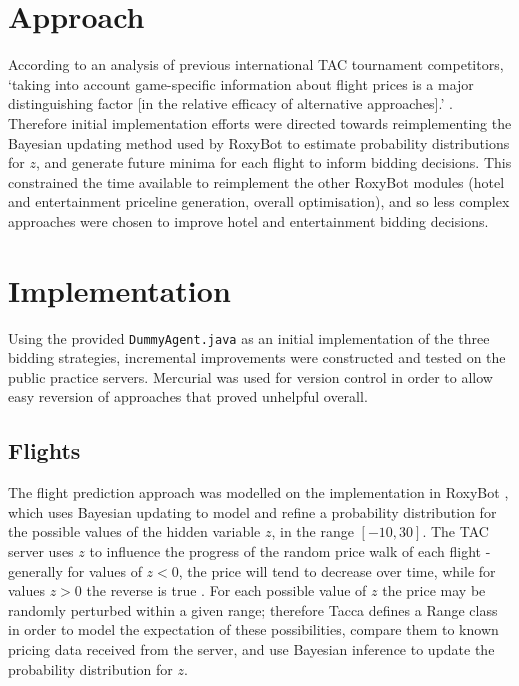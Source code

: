 \documentclass[oribibl]{llncs}
\begin{document}
\section{Approach}
According to an analysis of previous international TAC tournament competitors, `taking into account game-specific information about flight prices is a major distinguishing factor [in the relative efficacy of alternative approaches].' \cite{wellman2003price}. Therefore initial implementation efforts were directed towards reimplementing the Bayesian updating method used by RoxyBot to estimate probability distributions for $z$, and generate future minima for each flight to inform bidding decisions. This constrained the time available to reimplement the other RoxyBot modules (hotel and entertainment priceline generation, overall optimisation), and so less complex approaches were chosen to improve hotel and entertainment bidding decisions.


\section{Implementation}
Using the provided \texttt{DummyAgent.java} as an initial implementation of the three bidding strategies, incremental improvements were constructed and tested on the public practice servers. Mercurial was used for version control in order to allow easy reversion of approaches that proved unhelpful overall.

\subsection{Flights}
The flight prediction approach was modelled on the implementation in RoxyBot \cite{lee2007roxybot}, which uses Bayesian updating to model and refine a probability distribution for the possible values of the hidden variable $z$, in the range $[-10,30]$. The TAC server uses $z$ to influence the progress of the random price walk of each flight - generally for values of $z < 0$, the price will tend to decrease over time, while for values $z > 0$ the reverse is true \cite{cheng2005walverine}. For each possible value of $z$ the price may be randomly perturbed within a given range; therefore Tacca defines a Range class in order to model the expectation of these possibilities, compare them to known pricing data received from the server, and use Bayesian inference to update the probability distribution for $z$.
\end{document}
